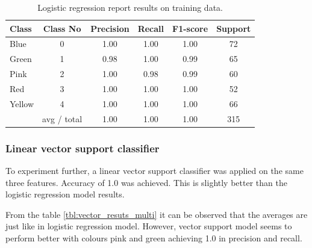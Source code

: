 \documentclass[11pt]{article}
\begin{document}
			\begin{center}
			  	\begin{table}[h]
			  	\centering
				\begin{tabular}[b]{| l | c | c | c | c | c |}
					\hline
					Class & Class No & Precision &  Recall & F1-score & Support  \\
		 			\hline
					  Blue  &  0  &    1.00   &   1.00   &   1.00    &    72 \\
			          Green &  1  &    0.98   &   1.00   &   0.99    &    65 \\
			          Pink  &  2   &    1.00   &   0.98   &   0.99    &    60 \\
			          Red  &   3   &    1.00   &   1.00   &   1.00    &    52 \\
			          Yellow & 4   &    1.00   &   1.00   &   1.00    &    66 \\
		  			\hline
					 & avg / total   &    1.00   &   1.00   &   1.00   &    315 \\
					\hline
				\end{tabular}
				\caption{Logistic regression report results on training data.}
				\label{tbl:logistic_resuts_multi}
				\end{table}
			\end{center}
			\vspace*{-1.3cm}
			\subsubsection{Linear vector support classifier}
				To experiment further, a linear vector support classifier was applied on the same three features. Accuracy of 1.0 was achieved. This is slightly better than the logistic regression model results. 

				From the table \ref{tbl:vector_resuts_multi} it can be observed that the averages are just like in logistic regression model. However, vector support model seems to perform better with colours pink and green achieving 1.0 in precision and recall. 
			
\end{document}
